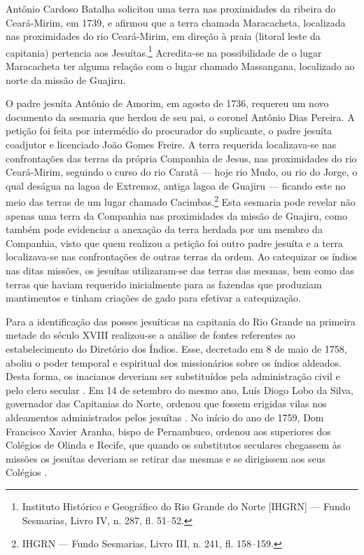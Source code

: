 Antônio Cardoso Batalha solicitou uma terra nas proximidades da ribeira do Ceará-Mirim, em 1739, e afirmou que a terra chamada Maracacheta, localizada nas proximidades do rio Ceará-Mirim, em direção à praia (litoral leste da capitania) pertencia aos Jesuítas.\footnote{Instituto Histórico e Geográfico do Rio Grande do Norte [IHGRN] --- Fundo Sesmarias, Livro IV, n. 287, fl. 51--52.} Acredita-se na possibilidade de o lugar Maracacheta ter alguma relação com o lugar chamado Massangana, localizado ao norte da missão de Guajiru.  

O padre jesuíta Antônio de Amorim, em agosto de 1736, requereu um novo documento da sesmaria que herdou de seu pai, o coronel Antônio Dias Pereira. A petição foi feita por intermédio do procurador do suplicante, o padre jesuíta coadjutor e licenciado João Gomes Freire. A terra requerida localizava-se nas confrontações das terras da própria Companhia de Jesus, nas proximidades do rio Ceará-Mirim, seguindo o curso do rio Caratã --- hoje rio Mudo, ou rio do Jorge, o qual deságua na lagoa de Extremoz, antiga lagoa de Guajiru \cite[p.~79]{Cascudo1968} --- ficando este no meio das terras de um lugar chamado Cacimbas.\footnote{IHGRN --- Fundo Sesmarias, Livro III, n. 241, fl. 158--159.} Esta sesmaria pode revelar não apenas uma terra da Companhia nas proximidades da missão de Guajiru, como também pode evidenciar a anexação da terra herdada por um membro da Companhia, visto que quem realizou a petição foi outro padre jesuíta e a terra localizava-se nas confrontações de outras terras da ordem. Ao catequizar os índios nas ditas missões, os jesuítas utilizaram-se das terras das mesmas, bem como das terras que haviam requerido inicialmente para as fazendas que produziam mantimentos e tinham criações de gado para efetivar a catequização.  

Para a identificação das posses jesuíticas na capitania do Rio Grande na primeira metade do século XVIII realizou-se a análise de fontes referentes ao estabelecimento do Diretório dos Índios. Esse, decretado em 8 de maio de 1758, aboliu o poder temporal e espiritual dos missionários sobre os índios aldeados. Desta forma, os inacianos deveriam ser substituídos pela administração civil e pelo clero secular \cite[p.~18--20]{Couto1990}. Em 14 de setembro do mesmo ano, Luís Diogo Lobo da Silva, governador das Capitanias do Norte, ordenou que fossem erigidas vilas nos aldeamentos administrados pelos jesuítas \cite[p.~43--46]{Couto1990}. No início do ano de 1759, Dom Francisco Xavier Aranha, bispo de Pernambuco, ordenou aos superiores dos Colégios de Olinda e Recife, que quando os substitutos seculares chegassem às missões os jesuítas deveriam se retirar das mesmas e se dirigissem aos seus Colégios \cite[p.~102]{Lopes2005}. 


